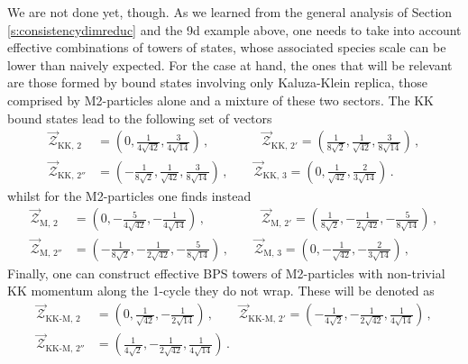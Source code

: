 We are not done yet, though. As we learned from the general analysis of Section \ref{s:consistencydimreduc} and the 9d example above, one needs to take into account effective combinations of towers of states, whose associated species scale can be lower than naively expected. For the case at hand, the ones that will be relevant are those formed by bound states involving only Kaluza-Klein replica, those comprised by M2-particles alone and a mixture of these two sectors. The KK bound states lead to the following set of vectors
%
\begin{equation} \label{eq:KKvectorscombined}
\begin{split} 
	\vec{\mathcal{Z}}_{\text{KK},\,2} &=  \left( 0, \frac{1}{4 \sqrt{42}}, \frac{3}{4 \sqrt{14}} \right) \, , \qquad \qquad \, \vec{\mathcal{Z}}_{\text{KK},\,2'} =  \left( \frac{1}{8 \sqrt{2}}, \frac{1}{ \sqrt{42}}, \frac{3}{8 \sqrt{14}} \right) \, ,\\
	\vec{\mathcal{Z}}_{\text{KK},\,2''} &=  \left( -\frac{1}{8 \sqrt{2}}, \frac{1}{ \sqrt{42}}, \frac{3}{8 \sqrt{14}} \right) \, , \qquad \vec{\mathcal{Z}}_{\text{KK},\,3} =  \left( 0, \frac{1}{ \sqrt{42}}, \frac{2}{3 \sqrt{14}} \right) \, .
\end{split}
\end{equation}
%
whilst for the M2-particles one finds instead
%
\begin{equation} \label{eq:M2vectorscombined}
\begin{split} 
	\vec{\mathcal{Z}}_{\text{M},\, 2} &=  \left( 0, -\frac{5}{4 \sqrt{42}}, -\frac{1}{4 \sqrt{14}} \right) \, , \qquad \qquad \ \ \vec{\mathcal{Z}}_{\text{M},\, 2'} =  \left( \frac{1}{8 \sqrt{2}}, -\frac{1}{ 2 \sqrt{42}}, -\frac{5}{8 \sqrt{14}} \right) \, ,\\
	\vec{\mathcal{Z}}_{\text{M},\, 2''} &=  \left( -\frac{1}{8 \sqrt{2}}, -\frac{1}{ 2 \sqrt{42}}, -\frac{5}{8 \sqrt{14}} \right) \, , \qquad \vec{\mathcal{Z}}_{\text{M},\, 3} =  \left( 0, -\frac{1}{ \sqrt{42}}, -\frac{2}{3 \sqrt{14}} \right) \, ,
\end{split}
\end{equation}
%
Finally, one can construct effective BPS towers of M2-particles with non-trivial KK momentum along the 1-cycle they do not wrap. These will be denoted as
%
\begin{equation} \label{eq:KK&M2vectorscombined}
\begin{split} 
	\vec{\mathcal{Z}}_{\text{KK-M},\, 2} &=  \left( 0, \frac{1}{\sqrt{42}}, -\frac{1}{2 \sqrt{14}} \right) \, , \qquad \vec{\mathcal{Z}}_{\text{KK-M},\, 2'} =  \left( -\frac{1}{4 \sqrt{2}}, -\frac{1}{2 \sqrt{42}}, \frac{1}{4 \sqrt{14}} \right) \, ,\\
	\vec{\mathcal{Z}}_{\text{KK-M},\, 2''} &=  \left( \frac{1}{4 \sqrt{2}}, -\frac{1}{2 \sqrt{42}}, \frac{1}{4 \sqrt{14}} \right) \, .
\end{split}
\end{equation}
